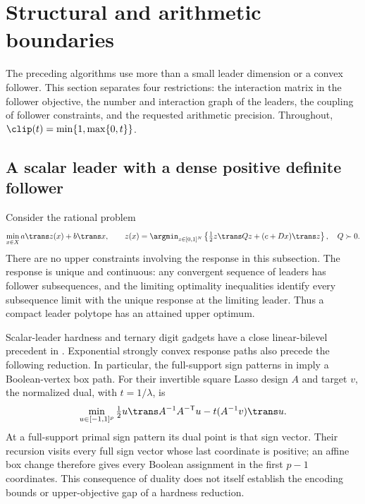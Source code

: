 \section{Structural and arithmetic boundaries}\label{sec:boundaries}
The preceding algorithms use more than a small leader dimension or a convex
follower. This section separates four restrictions: the interaction matrix in
the follower objective, the number and interaction graph of the leaders, the
coupling of follower constraints, and the requested arithmetic precision.
Throughout, \(\clip(t)=\min\{1,\max\{0,t\}\}\).

\subsection{A scalar leader with a dense positive definite follower}
\label{subsec:dense-hardness}
Consider the rational problem
\begin{equation}\label{eq:dense-box-model}
 \min_{x\in X} a\trans z(x)+b\trans x,\qquad
 z(x)=\argmin_{z\in[0,1]^N}
 \left\{\tfrac12z\trans Qz+(c+Dx)\trans z\right\},\quad Q\succ0.
\end{equation}
There are no upper constraints involving the response in this subsection.
The response is unique and continuous: any convergent sequence of leaders has
follower subsequences, and the limiting optimality inequalities identify every
subsequence limit with the unique response at the limiting leader. Thus a
compact leader polytope has an attained upper optimum.

Scalar-leader hardness and ternary digit gadgets have a close linear-bilevel
precedent in \citet[Theorem~1 and Section~4]{SugishitaCarvalho2026}. Exponential
strongly convex response paths also precede the following reduction.
In particular, the full-support sign patterns in
\citet[Proposition~2, equation~(4)]{MairalYu2012} imply a Boolean-vertex box path.
For their invertible square Lasso design \(A\) and target \(v\), the normalized
dual, with \(t=1/\lambda\), is
\[
 \min_{u\in[-1,1]^p}\tfrac12u\trans A^{-1}A^{-\mathsf T}u
       -t(A^{-1}v)\trans u.
\]
At a full-support primal sign pattern its dual point is that sign vector.
Their recursion visits every full sign vector whose last coordinate is positive;
an affine box change therefore gives every Boolean assignment in the first
\(p-1\) coordinates. This consequence of duality does not itself establish the
encoding bounds or upper-objective gap of a hardness reduction.

